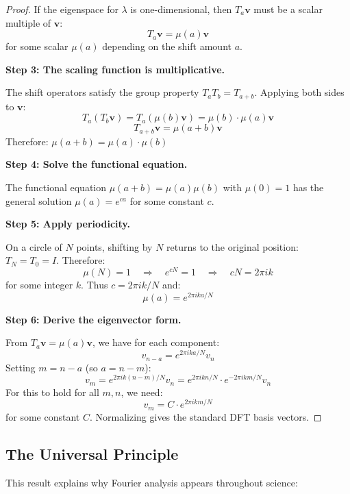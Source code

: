 \begin{notechapter}
\begin{proof}
If the eigenspace for $\lambda$ is one-dimensional, then $T_a \mathbf{v}$ 
must be a scalar multiple of $\mathbf{v}$:
\[
T_a \mathbf{v} = \mu(a) \mathbf{v}
\]
for some scalar $\mu(a)$ depending on the shift amount $a$.

\textbf{Step 3: The scaling function is multiplicative.}

The shift operators satisfy the group property $T_a T_b = T_{a+b}$. 
Applying both sides to $\mathbf{v}$:
\[
T_a(T_b \mathbf{v}) = T_a(\mu(b) \mathbf{v}) = \mu(b) \cdot \mu(a) \mathbf{v}
\]
\[
T_{a+b} \mathbf{v} = \mu(a+b) \mathbf{v}
\]
Therefore: $\mu(a+b) = \mu(a) \cdot \mu(b)$

\textbf{Step 4: Solve the functional equation.}

The functional equation $\mu(a+b) = \mu(a)\mu(b)$ with $\mu(0) = 1$ has 
the general solution $\mu(a) = e^{ca}$ for some constant $c$.

\textbf{Step 5: Apply periodicity.}

On a circle of $N$ points, shifting by $N$ returns to the original 
position: $T_N = T_0 = I$. Therefore:
\[
\mu(N) = 1 \quad \Rightarrow \quad e^{cN} = 1 \quad \Rightarrow \quad 
cN = 2\pi i k
\]
for some integer $k$. Thus $c = 2\pi i k/N$ and:
\[
\mu(a) = e^{2\pi i ka/N}
\]

\textbf{Step 6: Derive the eigenvector form.}

From $T_a \mathbf{v} = \mu(a) \mathbf{v}$, we have for each component:
\[
v_{n-a} = e^{2\pi i ka/N} v_n
\]
Setting $m = n - a$ (so $a = n - m$):
\[
v_m = e^{2\pi i k(n-m)/N} v_n = e^{2\pi i kn/N} \cdot e^{-2\pi i km/N} v_n
\]
For this to hold for all $m, n$, we need:
\[
v_m = C \cdot e^{2\pi i km/N}
\]
for some constant $C$. Normalizing gives the standard DFT basis vectors.
\end{proof}

\subsection{The Universal Principle}

This result explains why Fourier analysis appears throughout science:

\begin{center}
\end{center}


\end{notechapter}
